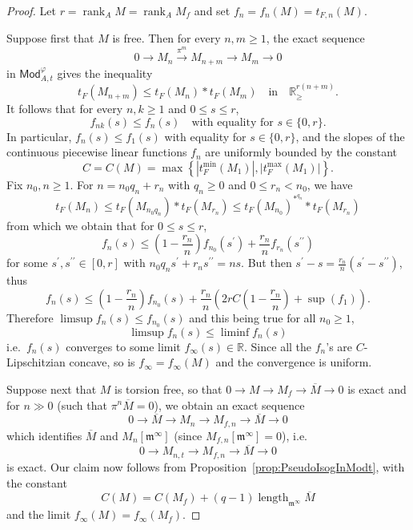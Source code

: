 \documentclass[11pt]{article}
\theoremstyle{definition}
\numberwithin{equation}{section}
\numberwithin{figure}{section}
\numberwithin{table}{section}
\newcommand{\Mod}{\mathsf{Mod}}
\DeclareMathOperator{\length}{length}
\DeclareMathOperator{\rank}{rank}
\begin{document}
\begin{proof}
Let $r=\rank_{A}M=\rank_{A}M_{f}$ and set $f_{n}=f_{n}(M)=t_{F,n}(M)$.

Suppose first that $M$ is free. Then for every $n,m\geq1$, the exact sequence
\[
0\rightarrow M_{n}\stackrel{\pi^{m}}{\longrightarrow}M_{n+m}\rightarrow M_{m}\rightarrow0
\]
in $\Mod_{A,t}^{\varphi}$ gives the inequality
\[
t_{F}(M_{n+m})\leq t_{F}(M_{n})\ast t_{F}(M_{m})\quad\text{in}\quad\mathbb{R}_{\geq}^{r(n+m)}.
\]
It follows that for every $n,k\geq1$ and $0\leq s\leq r$,
\[
f_{nk}(s)\leq f_{n}(s)\quad\text{with equality for }s\in\{0,r\}.
\]
In particular, $f_{n}(s)\leq f_{1}(s)$ with equality for $s\in\{0,r\}$, and the slopes of the continuous piecewise linear functions $f_{n}$ are uniformly bounded by the constant
\[
C=C(M)=\max\left\{ \left|t_{F}^{\min}(M_{1})\right|,\left|t_{F}^{\max}(M_{1})\right|\right\}.
\]
Fix $n_{0},n\geq1$. For $n=n_{0}q_{n}+r_{n}$ with $q_{n}\geq0$ and $0\leq r_{n}<n_{0}$, we have
\[
t_{F}(M_{n})\leq t_{F}(M_{n_{0}q_{n}})\ast t_{F}(M_{r_{n}})\leq t_{F}(M_{n_{0}})^{\ast^{q_{n}}}\ast t_{F}(M_{r_{n}})
\]
from which we obtain that for $0\leq s\leq r$,
\[
f_{n}(s)\leq\left(1-\frac{r_{n}}{n}\right)f_{n_{0}}(s^{\prime})+{\frac{r_{n}}{n}}f_{r_{n}}(s^{\prime\prime})
\]
for some $s^{\prime},s^{\prime\prime}\in[0,r]$ with $n_{0}q_{n}s^{\prime}+r_{n}s^{\prime\prime}=ns$. But then $s^{\prime}-s=\frac{r_{n}}{n}(s^{\prime}-s^{\prime\prime})$, thus
\[
f_{n}(s)\leq\left(1-\frac{r_{n}}{n}\right)f_{n_{0}}(s)+{\frac{r_{n}}{n}}\left(2rC\left(1-\frac{r_{n}}{n}\right)+\sup(f_{1})\right).
\]
Therefore $\limsup f_{n}(s)\leq f_{n_{0}}(s)$ and this being true for all $n_{0}\geq1$,
\[
\limsup f_{n}(s)\leq\liminf f_{n}(s)
\]
i.e.~$f_{n}(s)$ converges to some limit $f_{\infty}(s)\in\mathbb{R}$. Since all the $f_{n}$'s are $C$-Lipschitzian concave, so is $f_{\infty}=f_{\infty}(M)$ and the convergence is uniform.

Suppose next that $M$ is torsion free, so that $0\rightarrow M\rightarrow M_{f}\rightarrow\overline{M}\rightarrow0$ is exact and for $n\gg0$ (such that $\pi^{n}\overline{M}=0$), we obtain an exact sequence
\[
0\rightarrow\overline{M}\rightarrow M_{n}\rightarrow M_{f,n}\rightarrow\overline{M}\rightarrow0
\]
which identifies $\overline{M}$ and $M_{n}[\mathfrak{m}^{\infty}]$ (since $M_{f,n}[\mathfrak{m}^{\infty}]=0$), i.e.
\[
0\rightarrow M_{n,t}\rightarrow M_{f,n}\rightarrow\overline{M}\rightarrow0
\]
is exact. Our claim now follows from Proposition~\ref{prop:PseudoIsogInModt}, with the constant
\[
C(M)=C(M_{f})+(q-1)\length_{\mathfrak{m}^{\infty}}\overline{M}
\]
and the limit $f_{\infty}(M)=f_{\infty}(M_{f})$.


\end{proof}
\end{document}
